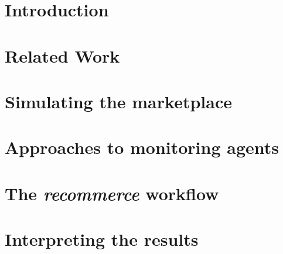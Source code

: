 \documentclass
[
    twoside,                 %
    openright,               %
    cleardoublepage = empty, %
    fontsize = 12 pt,        %
    british,                 %
    captions = tableheading, %
    numbers = noenddot,      %
    footheight = 35 pt,      %
]
{scrbook}
\begin{document}
\frontmatter


\pagestyle{plain}





% 

\tableofcontents

\pagestyle{headings}
\mainmatter


% 

\chapter{Introduction}


\chapter{Related Work}


\chapter{Simulating the marketplace}


\chapter{Approaches to monitoring agents}


\chapter{The \emph{recommerce} workflow}


\chapter{Interpreting the results}

\end{document}
